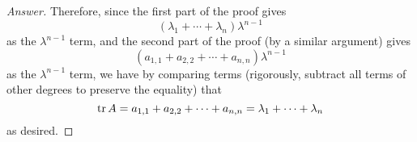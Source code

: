 \documentclass[../psets.tex]{subfiles}
\begin{document}
\begin{enumerate}[label={\textbf{1.\arabic*.}}]
\begin{proof}[Answer]
        Therefore, since the first part of the proof gives
        \begin{equation*}
            (\lambda_1+\cdots+\lambda_n)\lambda^{n-1}
        \end{equation*}
        as the $\lambda^{n-1}$ term, and the second part of the proof (by a similar argument) gives
        \begin{equation*}
            (a_{1,1}+a_{2,2}+\cdots+a_{n,n})\lambda^{n-1}
        \end{equation*}
        as the $\lambda^{n-1}$ term, we have by comparing terms (rigorously, subtract all terms of other degrees to preserve the equality) that
        \begin{equation*}
            \trace A = a_{1,1}+a_{2,2}+\cdots+a_{n,n} = \lambda_1+\cdots+\lambda_n
        \end{equation*}
        as desired.
    \end{proof}
\end{enumerate}
\end{document}
